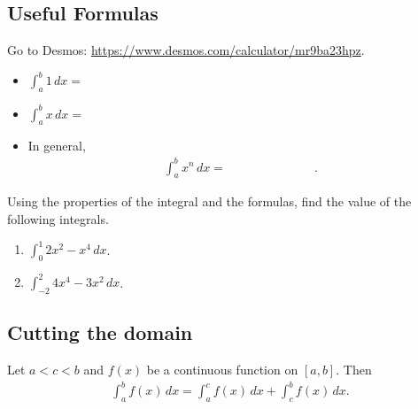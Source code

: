 \documentclass[12pt,a4paper]{article}
\newcounter{example}[section]
\begin{document}
	\newpage
	
	\subsection{Useful Formulas}
	Go to Desmos: \url{https://www.desmos.com/calculator/mr9ba23hpz}.
		\begin{multicols}{2}
		\begin{itemize}
		\item $\displaystyle\int_a^b 1 \, dx = $
		\item $\displaystyle\int_a^b x \, dx = $
		\end{itemize}
		\end{multicols}
	\begin{itemize}
	\item In general,
		\begin{align*}
		\int_a^b x^n \, dx = \phantom{\frac{b^{n+1} - a^{n+1}}{n + 1} 222222} .
		\end{align*}
	\end{itemize}
	
	\begin{example}
	Using the properties of the integral and the formulas, find the value of the following integrals.
		\begin{enumerate}[label=\textbf{(\alph*)}]
		\item $\displaystyle \int_0^1 2x^2 - x^4 \, dx$.
		\item $\displaystyle \int_{-2}^2 4x^4 - 3 x^2 \, dx$.
		\end{enumerate}
	\end{example}
	
	\newpage
	
	\subsection{Cutting the domain}
	Let $a < c < b$ and $f(x)$ be a continuous function on $[a, b]$. Then
		\begin{align*}
		\int_a^b f(x) \, dx = \int_a^c f(x) \, dx + \int_c^b f (x) \, dx .
		\end{align*}
	
\end{document}
